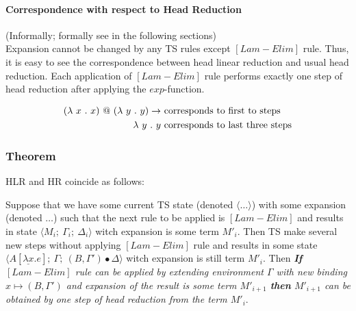 \documentclass[a4paper, 10pt]{article}
\begin{document}
\paragraph{Correspondence with respect to Head Reduction} (Informally; formally see in the following sections) \\
Expansion cannot be changed by any TS rules except $[Lam-Elim]$ rule. Thus, 
it is easy to see the correspondence between head linear reduction and usual head
reduction. Each application of $[Lam-Elim]$ rule performs exactly one step of head
reduction after applying the $exp$-function.

\begin{align*}
  (\lambda \ x\ .\ x)\ @\ (\lambda \ y\ .\  y) \rightarrow &\ \textnormal{corresponds to first to steps} \\
  \lambda \ y\ .\ y  &\ \textnormal{corresponds to last three steps}
\end{align*}

\subsubsection{Theorem} HLR and HR coincide as follows:

Suppose that we have some current TS state (denoted $\langle \dots \rangle$) with some expansion (denoted $\dots$)
such that the next rule to be applied is $[Lam-Elim]$ and results in state $\langle M_i;\ \Gamma_i;\ \Delta_i \rangle$ witch
expansion is some term $M'_i$. Then TS make several new steps without applying $[Lam-Elim]$ rule and results in some
state $\langle A[\underline{\lambda x}. e];\ \Gamma;\ (B,\Gamma')\bullet\Delta \rangle$ witch expansion is still term
$M'_i$. Then 
\emph{\textbf{If} $[Lam-Elim]$ rule can be applied by extending environment $\Gamma$ with new binding 
  $x \mapsto (B,\Gamma')$ and expansion of the result is some term $M'_{i+1}$
  \textbf{then} $M'_{i+1}$ can be obtained by one step of head reduction from the term $M'_i$}.

\end{document}

